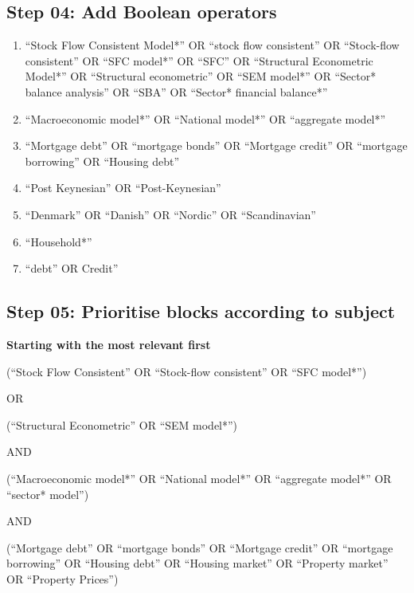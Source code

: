 \documentclass[
]{book}
\providecommand{\tightlist}{%
  \setlength{\itemsep}{0pt}\setlength{\parskip}{0pt}}
\begin{document}
\hypertarget{step-04-add-boolean-operators}{%
\subsection{Step 04: Add Boolean operators}\label{step-04-add-boolean-operators}}

\begin{enumerate}
\def\labelenumi{\arabic{enumi}.}
\tightlist
\item
  ``Stock Flow Consistent Model*'' OR ``stock flow consistent'' OR ``Stock-flow consistent'' OR ``SFC model*'' OR ``SFC'' OR ``Structural Econometric Model*'' OR ``Structural econometric'' OR ``SEM model*'' OR ``Sector* balance analysis'' OR ``SBA'' OR ``Sector* financial balance*''
\item
  ``Macroeconomic model*'' OR ``National model*'' OR ``aggregate model*''
\item
  ``Mortgage debt'' OR ``mortgage bonds'' OR ``Mortgage credit'' OR ``mortgage borrowing'' OR ``Housing debt''
\item
  ``Post Keynesian'' OR ``Post-Keynesian''
\item
  ``Denmark'' OR ``Danish'' OR ``Nordic'' OR ``Scandinavian''
\item
  ``Household*''
\item
  ``debt'' OR Credit''
\end{enumerate}

\hypertarget{step-05-prioritise-blocks-according-to-subject}{%
\subsection{Step 05: Prioritise blocks according to subject}\label{step-05-prioritise-blocks-according-to-subject}}

\textbf{Starting with the most relevant first}

(``Stock Flow Consistent'' OR ``Stock-flow consistent'' OR ``SFC model*'')

OR

(``Structural Econometric'' OR ``SEM model*'')

AND

(``Macroeconomic model*'' OR ``National model*'' OR ``aggregate model*'' OR ``sector* model'')

AND

(``Mortgage debt'' OR ``mortgage bonds'' OR ``Mortgage credit'' OR ``mortgage borrowing'' OR ``Housing debt'' OR ``Housing market'' OR ``Property market'' OR ``Property Prices'')
\end{document}

